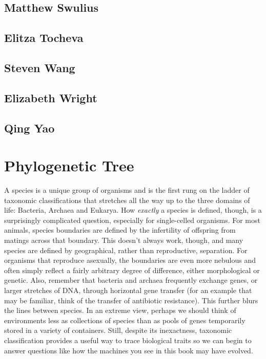 \documentclass[]{tufte-book}
\begin{document}
\hypertarget{matthew_swulius}{%
\section*{Matthew Swulius}\label{matthew_swulius}}

\hypertarget{elitza_tocheva}{%
\section*{Elitza Tocheva}\label{elitza_tocheva}}

\hypertarget{steven_wang}{%
\section*{Steven Wang}\label{steven_wang}}

\hypertarget{elizabeth_wright}{%
\section*{Elizabeth Wright}\label{elizabeth_wright}}

\hypertarget{qing_yao}{%
\section*{Qing Yao}\label{qing_yao}}

\hypertarget{tree}{%
\chapter{Phylogenetic Tree}\label{tree}}

A species is a unique group of organisms and is the first rung on the ladder of taxonomic classifications that stretches all the way up to the three domains of life: Bacteria, Archaea and Eukarya. How \emph{exactly} a species is defined, though, is a surprisingly complicated question, especially for single-celled organisms. For most animals, species boundaries are defined by the infertility of offspring from matings across that boundary. This doesn't always work, though, and many species are defined by geographical, rather than reproductive, separation. For organisms that reproduce asexually, the boundaries are even more nebulous and often simply reflect a fairly arbitrary degree of difference, either morphological or genetic. Also, remember that bacteria and archaea frequently exchange genes, or larger stretches of DNA, through horizontal gene transfer (for an example that may be familiar, think of the transfer of antibiotic resistance). This further blurs the lines between species. In an extreme view, perhaps we should think of environments less as collections of species than as pools of genes temporarily stored in a variety of containers. Still, despite its inexactness, taxonomic classification provides a useful way to trace biological traits so we can begin to answer questions like how the machines you see in this book may have evolved.
\end{document}
